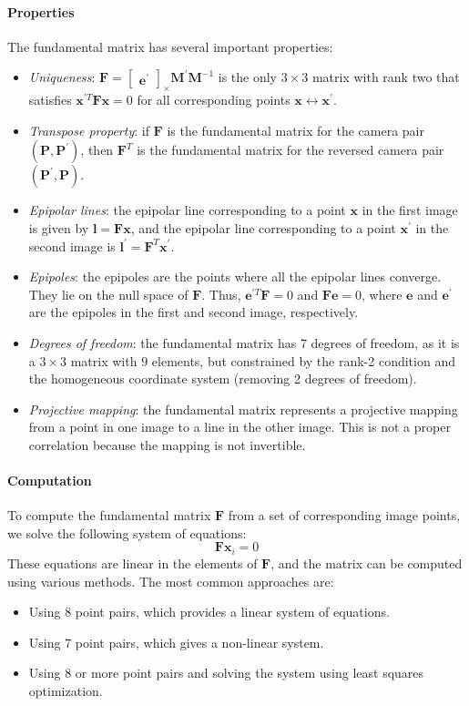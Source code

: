 \paragraph*{Properties}
The fundamental matrix has several important properties:
\begin{itemize}
    \item \textit{Uniqueness}: $\mathbf{F} = \begin{bmatrix} \mathbf{e}^\prime \end{bmatrix}_{\times} \mathbf{M}^\prime \mathbf{M}^{-1}$ is the only $3\times 3$ matrix with rank two that satisfies $\mathbf{x}^{\prime T} \mathbf{F} \mathbf{x} = 0$ for all corresponding points $\mathbf{x} \leftrightarrow \mathbf{x}^\prime$.
    \item \textit{Transpose property}: if $\mathbf{F}$ is the fundamental matrix for the camera pair $(\mathbf{P}, \mathbf{P}^\prime)$, then $\mathbf{F}^T$ is the fundamental matrix for the reversed camera pair $(\mathbf{P}^\prime, \mathbf{P})$.
    \item \textit{Epipolar lines}: the epipolar line corresponding to a point $\mathbf{x}$ in the first image is given by $\mathbf{l} = \mathbf{F} \mathbf{x}$, and the epipolar line corresponding to a point $\mathbf{x}^\prime$ in the second image is $\mathbf{l}^\prime = \mathbf{F}^T \mathbf{x}^\prime$.
    \item \textit{Epipoles}: the epipoles are the points where all the epipolar lines converge. 
        They lie on the null space of $\mathbf{F}$. 
        Thus, $\mathbf{e}^{\prime T} \mathbf{F} = 0$ and $\mathbf{F} \mathbf{e} = 0$, where $\mathbf{e}$ and $\mathbf{e}^\prime$ are the epipoles in the first and second image, respectively.
    \item \textit{Degrees of freedom}: the fundamental matrix has 7 degrees of freedom, as it is a $3\times 3$ matrix with $9$ elements, but constrained by the rank-2 condition and the homogeneous coordinate system (removing 2 degrees of freedom).
    \item \textit{Projective mapping}: the fundamental matrix represents a projective mapping from a point in one image to a line in the other image. 
        This is not a proper correlation because the mapping is not invertible.
\end{itemize}

\paragraph*{Computation}
To compute the fundamental matrix $\mathbf{F}$ from a set of corresponding image points, we solve the following system of equations:
\[\mathbf{F}\mathbf{x}_i=0\]
These equations are linear in the elements of $\mathbf{F}$, and the matrix can be computed using various methods. 
The most common approaches are:
\begin{itemize}
    \item Using 8 point pairs, which provides a linear system of equations.
    \item Using 7 point pairs, which gives a non-linear system.
    \item Using 8 or more point pairs and solving the system using least squares optimization.
\end{itemize}
